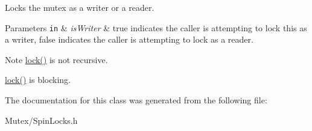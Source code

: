 Locks the mutex as a writer or a reader. 


\begin{DoxyParams}[1]{Parameters}
\mbox{\tt in}  & {\em is\-Writer} & true indicates the caller is attempting to lock this as a writer, false indicates the caller is attempting to lock as a reader. \\
\hline
\end{DoxyParams}
\begin{DoxyNote}{Note}
\hyperlink{class_d_x_1_1_spin_r_w_mutex_ac2b4ebd8c8bd297c5e2d907c92c75a56}{lock()} is not recursive. 

\hyperlink{class_d_x_1_1_spin_r_w_mutex_ac2b4ebd8c8bd297c5e2d907c92c75a56}{lock()} is blocking. 
\end{DoxyNote}


The documentation for this class was generated from the following file\-:\begin{DoxyCompactItemize}
\item 
Mutex/Spin\-Locks.\-h\end{DoxyCompactItemize}
